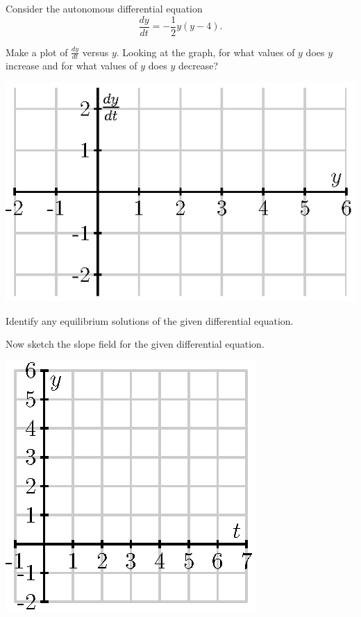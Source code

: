 \begin{activity} \label{A:7.2.1}  
  Consider the autonomous differential equation 
$$
\frac{dy}{dt} = -\frac 12 y(y-4).
$$

\ba
\item Make a plot of $\frac{dy}{dt}$ versus $y$.  Looking at the
  graph, for what values of $y$ does $y$ increase and for what values of $y$
  does $y$ decrease?

  \begin{center}
    \includegraphics{figures/7_2_Act2_1.eps}
  \end{center}

\item Identify any equilibrium solutions of the given differential equation.

\item Now sketch the slope field for the given differential equation.

  \begin{center}
    \includegraphics{figures/7_2_Act2_2.eps}
  \end{center}


\end{activity}
